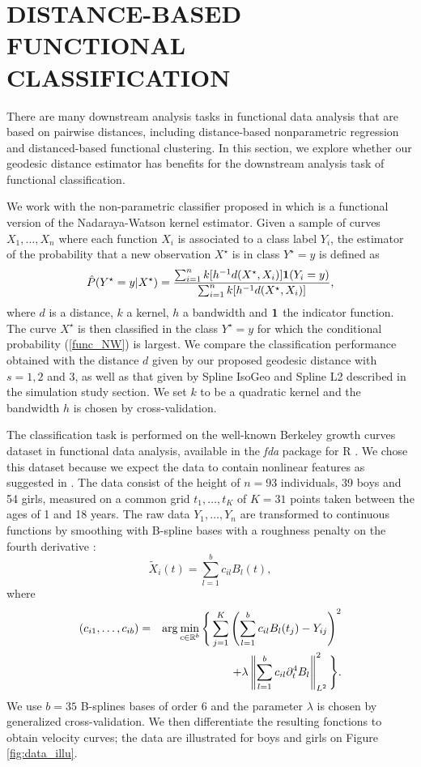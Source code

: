 \section{DISTANCE-BASED FUNCTIONAL CLASSIFICATION}\label{distance-based-functional-classification-marie}

There are many downstream analysis tasks in functional data analysis that are based on pairwise distances, including distance-based nonparametric regression and distanced-based functional clustering.
In this section, we explore whether our geodesic distance estimator has
benefits for the downstream analysis task of functional classification. 

We work with the non-parametric classifier proposed in \cite{Ferraty2006} which is a functional version of the Nadaraya-Watson kernel estimator. Given a sample of curves $X_1,\ldots,X_n$ where each function $X_i$ is associated to a class label $Y_i$, the estimator of the probability that a new observation $X^\star$ is in class $Y^\star=y$ is defined as
\begin{equation}\label{func_NW}
\hat P(Y^\star = y | X^\star)= \frac{ \sum_{i=1}^n k[h^{-1} d(X^\star,X_i)] {\bf{1}}(Y_i = y) }{ \sum_{i=1}^n k[h^{-1} d(X^\star,X_i)] },
\end{equation}
where $d$ is a distance, $k$ a kernel, $h$ a bandwidth and $\bf{1}$ the indicator function. The curve $X^\star$ is then classified in the class $Y^\star =y$ for which the conditional probability (\ref{func_NW}) is largest. We compare the classification performance obtained with the distance $d$ given by our proposed geodesic distance with $s=1,2$ and $3$, as well as that given by Spline IsoGeo and Spline L2 described in the simulation study section. We set $k$ to be a quadratic kernel and the bandwidth $h$ is chosen by cross-validation. 

The classification task is performed on the well-known Berkeley growth curves dataset in functional data analysis, available in the \emph{fda} package \cite{Ram-Hoo-Gra} for R \cite{Rproject}. We chose this dataset because we expect the data to contain nonlinear features as suggested in \cite{ChenMuller2012}. The data consist of the height of $n=93$ individuals, 39 boys and 54 girls, measured on a common grid $t_1,\ldots,t_K$ of $K=31$ points taken between the ages of 1 and 18 years. The raw data $Y_1,\ldots,Y_n$ are transformed to continuous functions by smoothing with B-spline bases with a roughness penalty on the fourth derivative :
$$\tilde X_i(t) = \sum_{l=1}^{b} c_{il}B_l(t), $$
where
 \begin{eqnarray*}
 (c_{i1},\ldots,c_{ib})&=&\arg \min_{c\in \mathbb{R}^b}\Bigg\{\sum_{j=1}^K\left(\sum_{l=1}^{b} c_{il}B_l(t_j)-Y_{ij}\right)^2\\
 &&\quad +\lambda \left\|\sum_{l=1}^{b} c_{il}\partial^4_tB_l\right\|^2_{L^2}\Bigg\}.
 \end{eqnarray*} 
We use $b=35$ B-splines bases of order 6 and the parameter $\lambda$ is chosen by generalized cross-validation. We then differentiate the resulting fonctions to obtain velocity curves; the data are illustrated for boys and girls on Figure \ref{fig:data_illu}.





